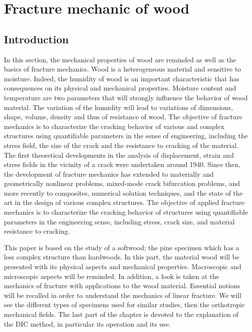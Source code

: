 \chapter{Fracture mechanic of wood}
\label{Chapter1}

\section{Introduction}

In this section, the mechanical properties of wood are reminded as well as the basics of fracture mechanics. 
Wood is a heterogeneous material and sensitive to moisture. Indeed, the humidity of wood is an important characteristic that has consequences on its physical and mechanical properties. Moisture content and temperature are two parameters that will strongly influence the behavior of wood material. The variation of the humidity will lead to variations of dimensions, shape, volume, density and thus of resistance of wood. 
The objective of fracture mechanics is to characterize the cracking behavior of various and complex structures using quantifiable parameters in the sense of engineering, including the stress field, the size of the crack and the resistance to cracking of the material. The first theoretical developments in the analysis of displacement, strain and stress fields in the vicinity of a crack were undertaken around 1940. Since then, the development of fracture mechanics has extended to materially and geometrically nonlinear problems, mixed-mode crack bifurcation problems, and more recently to composites, numerical solution techniques, and the state of the art in the design of various complex structures. The objective of applied fracture mechanics is to characterize the cracking behavior of structures using quantifiable parameters in the engineering sense, including stress, crack size, and material resistance to cracking.

This paper is based on the study of a softwood; the pine specimen which has a less complex structure than hardwoods. In this part, the material wood will be presented with its physical aspects and mechanical properties. Macroscopic and microscopic aspects will be reminded.
In addition, a look is taken at the mechanics of fracture with applications to the wood material. Essential notions will be recalled in order to understand the mechanics of linear fracture. We will see the different types of specimens used for similar studies, then the orthotropic mechanical fields. The last part of the chapter is devoted to the explanation of the DIC method, in particular its operation and its use.

